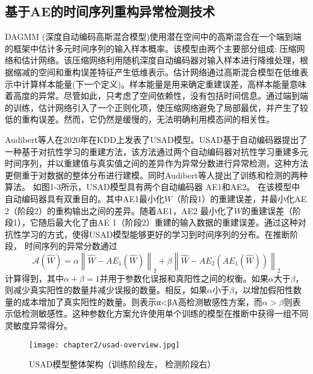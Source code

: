 \subsection{基于AE的时间序列重构异常检测技术}
DAGMM (深度自动编码高斯混合模型)\cite{dagmm}使用潜在空间中的高斯混合在一个端到端的框架中估计多元时间序列的输入样本概率。该模型由两个主要部分组成: 压缩网络和估计网络。该压缩网络利用随机深度自动编码器对输入样本进行降维处理，根据缩减的空间和重构误差特征产生低维表示。估计网络通过高斯混合模型在低维表示中计算样本能量(下一个定义)。样本能量是用来确定重建误差，高样本能量意味着高度的异常。尽管如此，只考虑了空间依赖性，没有包括时间信息。通过端到端的训练，估计网络引入了一个正则化项，使压缩网络避免了局部最优，并产生了较低的重构误差。然而，它仍然是缓慢的，无法明确利用模态间的相关性。

Audibert等人\cite{usad}在2020年在KDD上发表了USAD模型。USAD基于自动编码器提出了一种基于对抗性学习的重建方法，该方法通过两个自动编码器对抗性学习重建多元时间序列，并以重建值与真实值之间的差异作为异常分数进行异常检测，这种方法更侧重于对数据的整体分布进行建模。同时Audibert等人提出了训练和检测的两种算法。
如图1-3所示，USAD模型具有两个自动编码器 AE1和AE2。 在该模型中自动编码器具有双重目的。其中AE1最小化$W$（阶段1）的重建误差，并最小化AE 2（阶段2）的重构输出之间的差异。随着AE1，AE2 最小化了$W$的重建误差（阶段1），它随后最大化了由AE 1（阶段2）重建的输入数据的重建误差。通过这种对抗性学习的方式，使得USAD模型能够更好的学习到时间序列的分布。在推断阶段， 时间序列的异常分数通过
\begin{equation}
    \mathscr{A}(\widehat{W})=\alpha\left\|\widehat{W}-A E_1(\widehat{W})\right\|_2+\beta\left\|\widehat{W}-A E_2\left(A E_1(\widehat{W})\right)\right\|_2
    \end{equation}
计算得到，其中$\alpha + \beta = 1$并用于参数化误报和真阳性之间的权衡。如果$\alpha$大于$\beta$，则减少真实阳性的数量并减少误报的数量。相反，如果$\alpha$小于$\beta$，以增加假阳性数量的成本增加了真实阳性的数量。则表示α<βA高检测敏感性方案，而$\alpha > \beta$则表示低检测敏感性。这种参数化方案允许使用单个训练的模型在推断中获得一组不同灵敏度异常得分。
\begin{figure}[htb]
    \centering
    \texttt{[image: chapter2/usad-overview.jpg]}
    \caption{USAD模型整体架构（训练阶段左， 检测阶段右）\cite{usad}}
    \end{figure}

